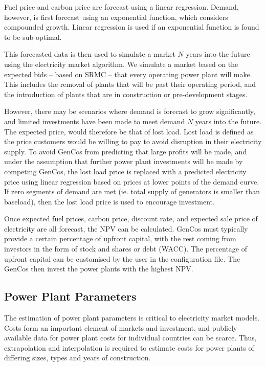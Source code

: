 Fuel price and carbon price are forecast using a linear regression. Demand, however, is first forecast using an exponential function, which considers compounded growth. Linear regression is used if an exponential function is found to be sub-optimal.

This forecasted data is then used to simulate a market $N$ years into the future using the electricity market algorithm. We simulate a market based on the expected bids -- based on SRMC -- that every operating power plant will make. This includes the removal of plants that will be past their operating period, and the introduction of plants that are in construction or pre-development stages. 

However, there may be scenarios where demand is forecast to grow significantly, and limited investments have been made to meet demand $N$ years into the future. The expected price, would therefore be that of lost load. Lost load is defined as the price customers would be willing to pay to avoid disruption in their electricity supply. To avoid GenCos from predicting that large profits will be made, and under the assumption that further power plant investments will be made by competing GenCos, the lost load price is replaced with a predicted electricity price using linear regression based on prices at lower points of the demand curve. If zero segments of demand are met (ie. total supply of generators is smaller than baseload), then the lost load price is used to encourage investment. 

Once expected fuel prices, carbon price, discount rate, and expected sale price of electricity are all forecast, the NPV can be calculated. GenCos must typically provide a certain percentage of upfront capital, with the rest coming from investors in the form of stock and shares or debt (WACC). The percentage of upfront capital can be customised by the user in the configuration file. The GenCos then invest the power plants with the highest NPV. 

\subsection{Power Plant Parameters}\label{ssssec:powerplantparameters}

The estimation of power plant parameters is critical to electricity market models. Costs form an important element of markets and investment, and publicly available data for power plant costs for individual countries can be scarce. Thus, extrapolation and interpolation is required to estimate costs for power plants of differing sizes, types and years of construction.


